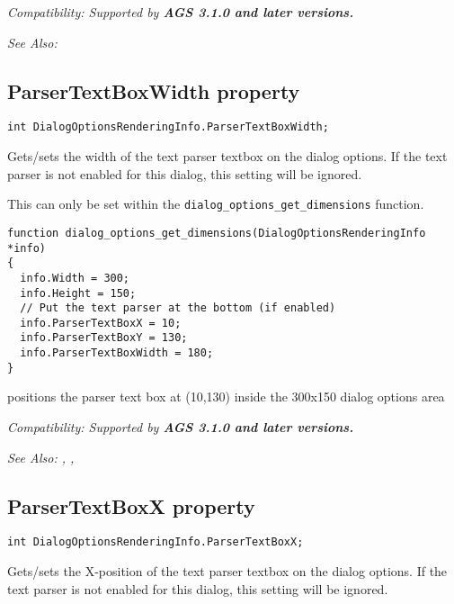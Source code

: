 \it{Compatibility:} Supported by \bf{AGS 3.1.0} and later versions.

\it{See Also:} 


\subsection{ParserTextBoxWidth property}\label{DialogOptionsRenderingInfo.ParserTextBoxWidth}%

\begin{verbatim}
int DialogOptionsRenderingInfo.ParserTextBoxWidth;
\end{verbatim}
Gets/sets the width of the text parser textbox on the dialog options.
If the text parser is not enabled for this dialog, this setting will be ignored.

This can only be set within the \verb$dialog_options_get_dimensions$ function.

\begin{verbatim}
function dialog_options_get_dimensions(DialogOptionsRenderingInfo *info)
{
  info.Width = 300;
  info.Height = 150;
  // Put the text parser at the bottom (if enabled)
  info.ParserTextBoxX = 10;
  info.ParserTextBoxY = 130;
  info.ParserTextBoxWidth = 180;
}
\end{verbatim}
positions the parser text box at (10,130) inside the 300x150 dialog options area

\it{Compatibility:} Supported by \bf{AGS 3.1.0} and later versions.

\it{See Also:} ,
,


\subsection{ParserTextBoxX property}\label{DialogOptionsRenderingInfo.ParserTextBoxX}%

\begin{verbatim}
int DialogOptionsRenderingInfo.ParserTextBoxX;
\end{verbatim}
Gets/sets the X-position of the text parser textbox on the dialog options.
If the text parser is not enabled for this dialog, this setting will be ignored.

